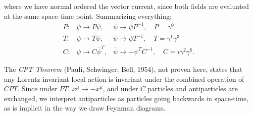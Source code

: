 \documentclass{article}
\numberwithin{equation}{section}
\begin{document}
where we have normal ordered the vector current, since both fields are evaluated at the same space-time point. Summarizing everything:
\begin{equation}
    \begin{array}{lll}
        P: & \psi \rightarrow P \psi, & \bar{\psi} \rightarrow \bar{\psi} P^{-1}, \quad P=\gamma^0 \\
        T: & \psi \rightarrow T \psi, & \bar{\psi} \rightarrow \bar{\psi} T^{-1}, \quad T=\gamma^1 \gamma^3 \\
        C: & \psi \rightarrow C \bar{\psi}^T, & \bar{\psi} \rightarrow-\psi^T C^{-1}, \quad C=i \gamma^2 \gamma^0.
        \end{array}
\end{equation}

The \textit{CPT Theorem} (Pauli, Schwinger, Bell, 1954), not proven here, states that any Lorentz invariant local action is invariant under the combined operation of $CPT$. Since under $PT$, $x^\mu \rightarrow -x^\mu$, and under $C$ particles and antiparticles are exchanged, we interpret antiparticles as particles going backwards in space-time, as is implicit in the way we draw Feynman diagrams.
\end{document}
